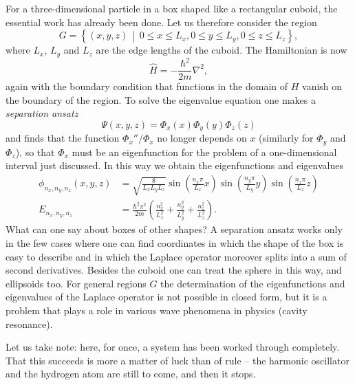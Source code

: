 For a three-dimensional particle in a box shaped like a rectangular cuboid, the
essential work has already been done. Let us therefore consider the region
\begin{equation}
	G = \left\{(x,y,z)\,\middle| \,  0\le x \le L_x, 0\le y \le L_y, 0\le z \le L_z  \right\},
\end{equation}
where $L_x$, $L_y$ and $L_z$ are the edge lengths of the cuboid. The Hamiltonian is
now 
\begin{equation}
	\widehat{H} = -\frac{\hbar^2}{2m}\nabla^2,
\end{equation}
again with the boundary condition that functions in the domain of $H$ vanish on the boundary of the region. To solve the eigenvalue equation one makes a \emph{separation ansatz}
\begin{equation}
	\Psi(x,y,z) = \Phi_x(x)\Phi_y(y)\Phi_z(z)
\end{equation}
and finds that the function $\Phi_x''/\Phi_x$ no longer depends on $x$ (similarly for $\Phi_y$ and $\Phi_z$), so that $\Phi_x$ must be an eigenfunction for the problem of a one-dimensional interval just discussed. In this way we obtain the eigenfunctions and eigenvalues
\begin{align}
	\phi_{n_x,n_y,n_z}(x,y,z) &= \sqrt{\frac{8}{L_xL_yL_z}} \sin\left(\frac{n_x\pi}{L_x} x\right)\sin\left(\frac{n_y\pi}{L_y} y\right)\sin\left(\frac{n_z\pi}{L_z} z\right) \\
	E_{n_x,n_y,n_z}&=\frac{\hbar^2\pi^2}{2m} \left(\frac{n_x^2}{L_x^2} + \frac{n_y^2}{L_y^2} + \frac{n_z^2}{L_z^2} \right).
\end{align}
What can one say about boxes of other shapes? A separation ansatz works only in the few cases where one can find coordinates in which the shape of the box is easy to describe and in which the
Laplace operator moreover splits into a sum of second derivatives. Besides the cuboid one can treat the sphere in this way, and ellipsoids too. For general regions $G$ the determination of the eigenfunctions
and eigenvalues of the Laplace operator is not possible in closed form, but it is a problem that plays a role in various wave phenomena in physics (cavity resonance).

Let us take note: here, for once, a system has been worked through completely. That this succeeds is more a matter of luck than of rule -- the harmonic oscillator and the hydrogen atom are still to come, and then it stops.